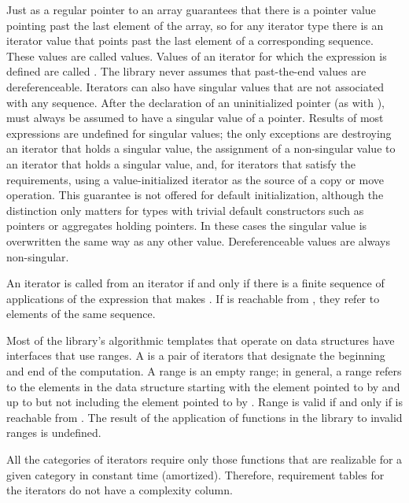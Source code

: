 \pnum
Just as a regular pointer to an array guarantees that there is a pointer value pointing past the last element
of the array, so for any iterator type there is an iterator value that points past the last element of a
corresponding sequence.
These values are called
values.
Values of an iterator
for which the expression
is defined are called
.
The library never assumes that past-the-end values are dereferenceable.
Iterators can also have singular values that are not associated with any
sequence.
\enterexample
After the declaration of an uninitialized pointer
(as with
),
must always be assumed to have a singular value of a pointer.
\exitexample
Results of most expressions are undefined for singular values;
the only exceptions are destroying an iterator that holds a singular value,
the assignment of a non-singular value to
an iterator that holds a singular value, and, for iterators that satisfy the
 requirements, using a value-initialized iterator
as the source of a copy or move operation. \enternote This guarantee is not
offered for default initialization, although the distinction only matters for types
with trivial default constructors such as pointers or aggregates holding pointers.
\exitnote
In these cases the singular
value is overwritten the same way as any other value.
Dereferenceable
values are always non-singular.

\pnum
An iterator
is called
from an iterator
if and only if there is a finite sequence of applications of
the expression
that makes
.
If
is reachable from
,
they refer to elements of the same sequence.

\pnum
Most of the library's algorithmic templates that operate on data structures have interfaces that use ranges.
A
is a pair of iterators that designate the beginning and end of the computation.
A range 
is an empty range;
in general, a range 
refers to the elements in the data structure starting with the element
pointed to by
and up to but not including the element pointed to by
.
Range 
is valid if and only if
is reachable from
.
The result of the application of functions in the library to invalid ranges is
undefined.

\pnum
All the categories of iterators require only those functions that are realizable for a given category in
constant time (amortized).
Therefore, requirement tables for the iterators do not have a complexity column.

